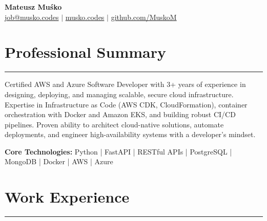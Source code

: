 \documentclass[10pt, a4paper]{article} %
\begin{document}
\begin{center}
    {\Huge \textbf{Mateusz Muśko}} \\
    \vspace{0.1cm}
    \href{mailto:job@musko.codes}{job@musko.codes} $|$
    \href{https://musko.codes}{musko.codes} $|$
    \href{https://github.com/MuskoM}{github.com/MuskoM} \\
\end{center}
\vspace{0.5cm}

\section*{Professional Summary}
\hrule
\vspace{0.2cm}
Certified AWS and Azure Software Developer with 3+ years of experience in designing, deploying, and managing scalable, secure cloud infrastructure. Expertise in Infrastructure as Code (AWS CDK, CloudFormation), container orchestration with Docker and Amazon EKS, and building robust CI/CD pipelines. Proven ability to architect cloud-native solutions, automate deployments, and engineer high-availability systems with a developer's mindset.
\vspace{0.3cm}

\textbf{Core Technologies:} Python | FastAPI | RESTful APIs | PostgreSQL | MongoDB | Docker | AWS | Azure

\vspace{0.5cm}

\section*{Work Experience}
\hrule
\end{document}
